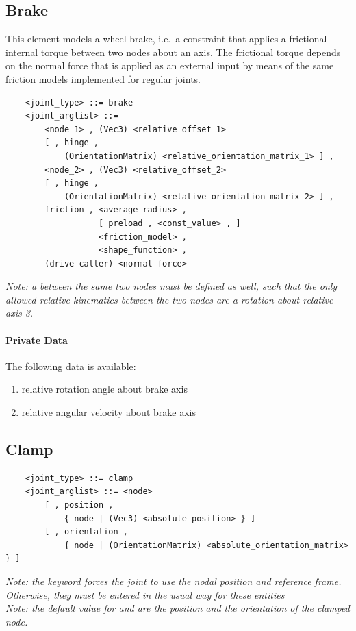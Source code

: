 \subsection{Brake}
This element models a wheel brake, i.e.\ a constraint that applies
a frictional internal torque between two nodes about an axis.
The frictional torque depends on the normal force that is applied 
as an external input by means of the same friction models implemented
for regular joints.
\begin{verbatim}
    <joint_type> ::= brake
    <joint_arglist> ::= 
        <node_1> , (Vec3) <relative_offset_1> 
        [ , hinge , 
            (OrientationMatrix) <relative_orientation_matrix_1> ] ,
        <node_2> , (Vec3) <relative_offset_2>
        [ , hinge , 
            (OrientationMatrix) <relative_orientation_matrix_2> ] ,
        friction , <average_radius> , 
                   [ preload , <const_value> , ]
                   <friction_model> , 
                   <shape_function> ,
        (drive caller) <normal force>
\end{verbatim}
\emph{Note: a  between the same two nodes 
must be defined as well, such that the only allowed relative kinematics 
between the two nodes are a rotation about relative axis 3.}

\paragraph{Private Data}
The following data is available:
\begin{enumerate}
\item {} relative rotation angle about brake axis
\item {} relative angular velocity about brake axis
\end{enumerate}




\subsection{Clamp}
\begin{verbatim}
    <joint_type> ::= clamp 
    <joint_arglist> ::= <node>
        [ , position ,
            { node | (Vec3) <absolute_position> } ]
        [ , orientation ,
            { node | (OrientationMatrix) <absolute_orientation_matrix> } ]
\end{verbatim}
\emph{Note: the keyword  forces the joint to use
the nodal position and reference frame. Otherwise, they must be entered
in the usual way for these entities} \\
\emph{Note: the default value for  and 
are the position and the orientation of the clamped node.}

